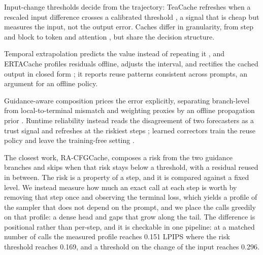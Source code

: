 Input-change thresholds decide from the trajectory: TeaCache refreshes when a rescaled input difference crosses a calibrated threshold \citep{liu2025teacache}, a signal that is cheap but measures the input, not the output error. Caches differ in granularity, from step \citep{liu2025teacache,liu2025taylorseer} and block \citep{chen2024ddit} to token \citep{zou2024toca,feng2026worldcache} and attention \citep{lv2024fastercache,zhao2024pab}, but share the decision structure.

Temporal extrapolation predicts the value instead of repeating it \citep{liu2025taylorseer}, and ERTACache profiles residuals offline, adjusts the interval, and rectifies the cached output in closed form \citep{peng2025ertacache}; it reports reuse patterns consistent across prompts, an argument for an offline policy.

Guidance-aware composition prices the error explicitly, separating branch-level from local-to-terminal mismatch and weighting proxies by an offline propagation prior \citep{liu2026racfgcache}. Runtime reliability instead reads the disagreement of two forecasters as a trust signal and refreshes at the riskiest steps \citep{li2026racer}; learned correctors train the reuse policy and leave the training-free setting \citep{ma2024learning}.

The closest work, RA-CFGCache, composes a risk from the two guidance branches and skips when that risk stays below a threshold, with a residual reused in between. The risk is a property of a step, and it is compared against a fixed level. We instead measure how much an exact call at each step is worth by removing that step once and observing the terminal loss, which yields a profile of the sampler that does not depend on the prompt, and we place the calls greedily on that profile: a dense head and gaps that grow along the tail. The difference is positional rather than per-step, and it is checkable in one pipeline: at a matched number of calls the measured profile reaches 0.151 LPIPS where the risk threshold reaches 0.169, and a threshold on the change of the input reaches 0.296.
